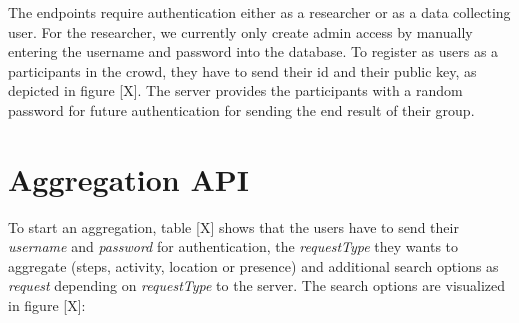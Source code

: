 The endpoints require authentication either as a researcher or as a data collecting user. For the researcher, we currently only create admin access by manually entering the username and password into the database. To register as users as a participants in the crowd, they have to send their id and their public key, as depicted in figure [X]. The server provides the participants with a random password for future authentication for sending the end result of their group.

\section{Aggregation API}

To start an aggregation, table [X] shows that the users have to send their \textit{username} and \textit{password} for authentication, the \textit{requestType} they wants to aggregate (steps, activity, location or presence) and additional search options as \textit{request} depending on \textit{requestType} to the server. The search options are visualized in figure [X]: 


